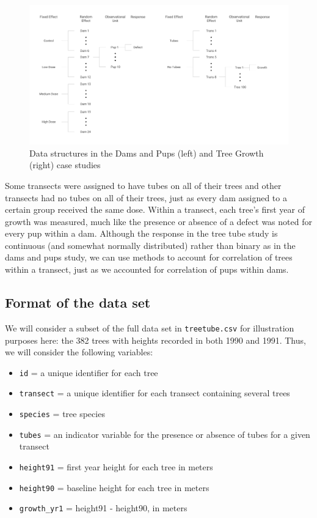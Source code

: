 \documentclass[
]{krantz}
\providecommand{\tightlist}{%
  \setlength{\itemsep}{0pt}\setlength{\parskip}{0pt}}
\begin{document}
\begin{figure}
\includegraphics[width=0.8\linewidth]{data/DamsTreesStructure} \caption{Data structures in the Dams and Pups (left) and Tree Growth (right) case studies}\label{fig:DamsTreesStructure}
\end{figure}

Some transects were assigned to have tubes on all of their trees and other transects had no tubes on all of their trees, just as every dam assigned to a certain group received the same dose. Within a transect, each tree's first year of growth was measured, much like the presence or absence of a defect was noted for every pup within a dam. Although the response in the tree tube study is continuous (and somewhat normally distributed) rather than binary as in the dams and pups study, we can use methods to account for correlation of trees within a transect, just as we accounted for correlation of pups within dams.

\hypertarget{format-of-the-data-set}{%
\subsection{Format of the data set}\label{format-of-the-data-set}}

We will consider a subset of the full data set in \texttt{treetube.csv} for illustration purposes here: the 382 trees with heights recorded in both 1990 and 1991. Thus, we will consider the following variables:

\begin{itemize}
\tightlist
\item
  \texttt{id} = a unique identifier for each tree
\item
  \texttt{transect} = a unique identifier for each transect containing several trees
\item
  \texttt{species} = tree species
\item
  \texttt{tubes} = an indicator variable for the presence or absence of tubes for a given transect
\item
  \texttt{height91} = first year height for each tree in meters
\item
  \texttt{height90} = baseline height for each tree in meters
\item
  \texttt{growth\_yr1} = height91 - height90, in meters
\end{itemize}
\end{document}
